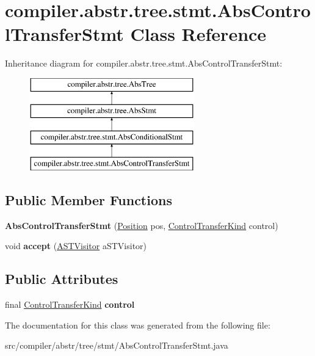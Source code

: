 \hypertarget{classcompiler_1_1abstr_1_1tree_1_1stmt_1_1_abs_control_transfer_stmt}{}\section{compiler.\+abstr.\+tree.\+stmt.\+Abs\+Control\+Transfer\+Stmt Class Reference}
\label{classcompiler_1_1abstr_1_1tree_1_1stmt_1_1_abs_control_transfer_stmt}
Inheritance diagram for compiler.\+abstr.\+tree.\+stmt.\+Abs\+Control\+Transfer\+Stmt\+:\begin{figure}[H]
\begin{center}
\leavevmode
\includegraphics[height=4.000000cm]{classcompiler_1_1abstr_1_1tree_1_1stmt_1_1_abs_control_transfer_stmt}
\end{center}
\end{figure}
\subsection*{Public Member Functions}
\begin{DoxyCompactItemize}
\item 
\mbox{\label{classcompiler_1_1abstr_1_1tree_1_1stmt_1_1_abs_control_transfer_stmt_adc4c65a153fb815e57888940ade153d5}} 
{\bfseries Abs\+Control\+Transfer\+Stmt} (\hyperlink{classcompiler_1_1_position}{Position} pos, \hyperlink{enumcompiler_1_1abstr_1_1tree_1_1_control_transfer_kind}{Control\+Transfer\+Kind} control)
\item 
\mbox{\label{classcompiler_1_1abstr_1_1tree_1_1stmt_1_1_abs_control_transfer_stmt_a3cba5a832f19f7e8254cb7f0fbdf4d87}} 
void {\bfseries accept} (\hyperlink{interfacecompiler_1_1abstr_1_1_a_s_t_visitor}{A\+S\+T\+Visitor} a\+S\+T\+Visitor)
\end{DoxyCompactItemize}
\subsection*{Public Attributes}
\begin{DoxyCompactItemize}
\item 
\mbox{\label{classcompiler_1_1abstr_1_1tree_1_1stmt_1_1_abs_control_transfer_stmt_aa5f40c15ea0262da672a6e2390dc8564}} 
final \hyperlink{enumcompiler_1_1abstr_1_1tree_1_1_control_transfer_kind}{Control\+Transfer\+Kind} {\bfseries control}
\end{DoxyCompactItemize}


The documentation for this class was generated from the following file\+:\begin{DoxyCompactItemize}
\item 
src/compiler/abstr/tree/stmt/Abs\+Control\+Transfer\+Stmt.\+java\end{DoxyCompactItemize}
